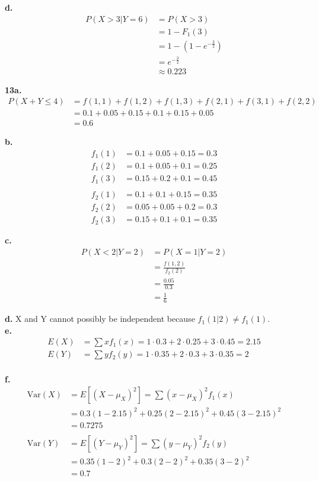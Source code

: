 \documentclass[12pt]{report}
\begin{document}
\noindent \textbf{d.} 
\begin{align*}
P(X > 3|Y = 6) &= P(X > 3)\\
&= 1 - F_1(3)\\
&= 1 - (1 - e^{-\frac{3}{2}})\\
&= e^{-\frac{3}{2}}\\
&\approx \boxed{0.223} 
\end{align*}

\pagebreak
\noindent \textbf{13a.} 
\begin{align*}
P(X+Y \leq 4) &= f(1,1) + f(1,2) + f(1,3) + f(2,1) + f(3,1) + f(2,2)\\
&= 0.1 + 0.05 + 0.15 + 0.1 + 0.15 + 0.05\\
&= \boxed{0.6} 
\end{align*}

\noindent \textbf{b.}
\begin{align*}
f_1(1) &= 0.1 + 0.05 + 0.15 = 0.3\\
f_1(2) &= 0.1 + 0.05 + 0.1 = 0.25\\
f_1(3) &= 0.15 + 0.2 + 0.1 = 0.45\\\\
f_2(1) &= 0.1 + 0.1 + 0.15 = 0.35\\
f_2(2) &= 0.05 + 0.05 + 0.2 = 0.3\\
f_2(3) &= 0.15 + 0.1 + 0.1 = 0.35 
\end{align*}

\noindent \textbf{c.}
\begin{align*}
P(X < 2 | Y = 2) &= P(X = 1 | Y = 2)\\
&= \frac{f(1,2)}{f_2(2)}\\
&= \frac{0.05}{0.3}\\
&= \boxed{\frac{1}{6}}
\end{align*}

\noindent \textbf{d.} X and Y cannot possibly be independent because $f_1(1|2) \neq f_1(1)$.\\
\noindent \textbf{e.} 
\begin{align*}
E(X) &= \sum xf_1(x) = 1 \cdot 0.3 + 2 \cdot 0.25 + 3 \cdot 0.45 = \boxed{2.15}\\
E(Y) &= \sum yf_2(y) = 1 \cdot 0.35 + 2 \cdot 0.3 + 3 \cdot 0.35 = \boxed{2}\\ 
\end{align*}

\pagebreak
\noindent \textbf{f.} 
\begin{align*}
\text{Var}(X) &= E\left[\left(X - \mu_X\right)^2\right] = \sum\left(x - \mu_X\right)^2f_1(x)\\
&= 0.3(1 - 2.15)^2 + 0.25(2 - 2.15)^2 + 0.45(3 - 2.15)^2\\
&= \boxed{0.7275}\\\\
\text{Var}(Y) &= E\left[\left(Y - \mu_Y\right)^2\right] = \sum\left(y - \mu_Y\right)^2f_2(y)\\
&= 0.35(1 - 2)^2 + 0.3(2-2)^2 + 0.35(3-2)^2\\
&= \boxed{0.7}
\end{align*}
\end{document}
